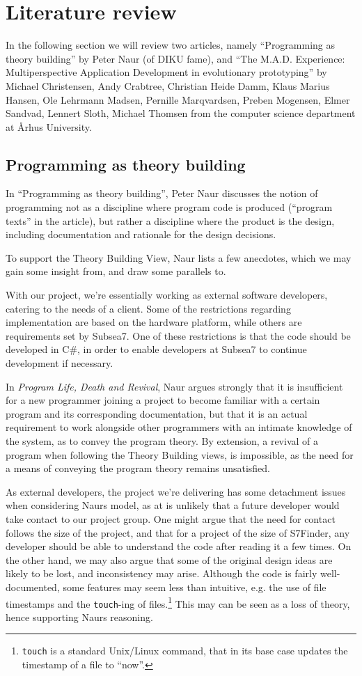 \section{Literature review}
In the following section we will review two articles, namely
``Programming as theory building'' by Peter Naur (of DIKU fame), and
``The M.A.D. Experience: Multiperspective Application Development in
evolutionary prototyping'' by Michael Christensen, Andy Crabtree,
Christian Heide Damm, Klaus Marius Hansen, Ole Lehrmann Madsen,
Pernille Marqvardsen, Preben Mogensen, Elmer Sandvad, Lennert Sloth,
Michael Thomsen from the computer science department at Århus
University. \cite{naur, mad-article}

\subsection{Programming as theory building}
In ``Programming as theory building'', Peter Naur discusses the notion
of programming not as a discipline where program code is produced
(``program texts'' in the article), but rather a discipline where the
product is the design, including documentation and rationale for the
design decisions.

To support the Theory Building View, Naur lists a few anecdotes, which
we may gain some insight from, and draw some parallels
to.

With our project, we're essentially working as external software
developers, catering to the needs of a client. Some of the
restrictions regarding implementation are based on the hardware
platform, while others are requirements set by Subsea7. One of these
restrictions is that the code should be developed in C\#, in order to
enable developers at Subsea7 to continue development if necessary.

In \textit{Program Life, Death and Revival}, Naur argues strongly that
it is insufficient for a new programmer joining a project to become familiar
with a certain program and its corresponding documentation, but that
it is an actual requirement to work alongside other programmers with
an intimate knowledge of the system, as to convey the program
theory. By extension, a revival of a program when following the Theory
Building views, is impossible, as the need for a means of conveying
the program theory remains unsatisfied.

As external developers, the project we're delivering has some
detachment issues when considering Naurs model, as at is unlikely that
a future developer would take contact to our project group. One might
argue that the need for contact follows the size of the project, and
that for a project of the size of S7Finder, any developer should be
able to understand the code after reading it a few times. On the other
hand, we may also argue that some of the original design ideas are
likely to be lost, and inconsistency may arise. Although the code is
fairly well-documented, some features may seem less than intuitive,
e.g. the use of file timestamps and the \texttt{touch}-ing of
files.\footnote{\texttt{touch} is a standard Unix/Linux command, that in its
  base case updates the timestamp of a file to ``now''.}
This may can be seen as a loss of theory, hence supporting Naurs reasoning.

